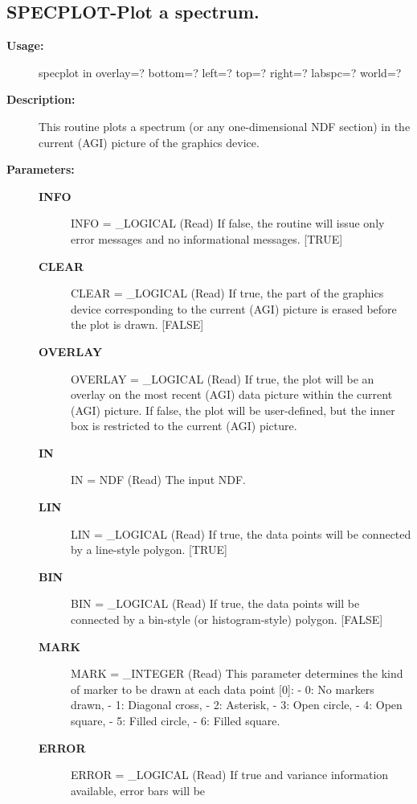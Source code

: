 \subsection{SPECPLOT-\label{SPECPLOT}Plot a spectrum.}
\begin{description}

\item [\textbf{Usage:}]

   specplot in overlay=? bottom=? left=? top=? right=?
      labspc=? world=?


\item [\textbf{Description:}]

   This routine plots a spectrum (or any one-dimensional NDF section)
   in the current (AGI) picture of the graphics device.


\item [\textbf{Parameters:}]
\begin{description}
\item [\textbf{INFO}]
INFO = \_LOGICAL (Read)
   If false, the routine will issue only error messages and no
   informational messages. [TRUE]
\item [\textbf{CLEAR}]
CLEAR = \_LOGICAL (Read)
   If true, the part of the graphics device corresponding to the
   current (AGI) picture is erased before the plot is drawn.
   [FALSE]
\item [\textbf{OVERLAY}]
OVERLAY = \_LOGICAL (Read)
   If true, the plot will be an overlay on the most recent (AGI)
   data picture within the current (AGI) picture.
   If false, the plot will be user-defined, but the inner box is
   restricted to the current (AGI) picture.
\item [\textbf{IN}]
IN = NDF (Read)
   The input NDF.
\item [\textbf{LIN}]
LIN = \_LOGICAL (Read)
   If true, the data points will be connected by a line-style
   polygon. [TRUE]
\item [\textbf{BIN}]
BIN = \_LOGICAL (Read)
   If true, the data points will be connected by a bin-style (or
   histogram-style) polygon. [FALSE]
\item [\textbf{MARK}]
MARK = \_INTEGER (Read)
   This parameter determines the kind of marker to be drawn at
   each data point [0]:
   -  0: No markers drawn,
   -  1: Diagonal cross,
   -  2: Asterisk,
   -  3: Open circle,
   -  4: Open square,
   -  5: Filled circle,
   -  6: Filled square.
\item [\textbf{ERROR}]
ERROR = \_LOGICAL (Read)
   If true and variance information available, error bars will be

\end{description}
\end{description}
